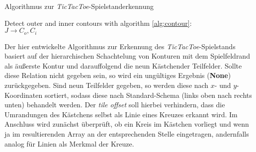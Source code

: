 \begin{algorithm}[!htbp]
    \LinesNumbered
    \SetAlgoLined
    \caption{Algorithmus zur \textit{TicTacToe}-Spielstanderkennung}\label{alg:tictactoe_detection}
    Detect outer and inner contours with algorithm \vref{alg:contour}:\\
    $J \rightarrow C_o, C_i$\\
\end{algorithm}

Der hier entwickelte Algorithmus zur Erkennung des \textit{TicTacToe}-Spielstands basiert auf der hierarchischen Schachtelung von Konturen mit dem Spielfeldrand als äußerste Kontur und darauffolgend die neun \dq Kästchen\dq der Teilfelder. Sollte diese Relation nicht gegeben sein, so wird ein ungültiges Ergebnis (\textbf{None}) zurückgegeben. Sind neun Teilfelder gegeben, so werden diese nach $x$- und $y$-Koordinaten sortiert, sodass diese nach Standard-Schema (\dq links oben nach rechts unten\dq ) behandelt werden. Der \textit{tile offset} soll hierbei verhindern, dass die Umrandungen des Kästchens selbst als Linie eines Kreuzes erkannt wird. Im Anschluss wird zunächst überprüft, ob ein Kreis im Kästchen vorliegt und wenn ja im resultierenden Array an der entsprechenden Stelle eingetragen, andernfalls analog für Linien als Merkmal der Kreuze.

